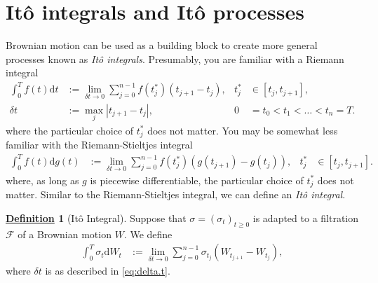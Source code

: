 \documentclass[12pt]{book}
\numberwithin{equation}{chapter}
\theoremstyle{plain}
\numberwithin{theorem}{section}
\theoremstyle{definition}
\newtheorem{definition}[theorem]{\underline{Definition}}
\numberwithin{exercise}{chapter}
\newcommand{\<}{\langle}
\renewcommand{\>}{\rangle}
\renewcommand{\(}{\left(}
\renewcommand{\)}{\right)}
\renewcommand{\[}{\left[}
\renewcommand{\]}{\right]}
\newcommand\Fc{\mathscr{F}}
\newcommand\sig{\sigma}
\newcommand\del{\delta}
\newcommand\dd{\mathrm{d}}
\theoremstyle{definition}
\numberwithin{question}{section}
\begin{document}
\section{It\^o integrals and It\^o processes}
Brownian motion can be used as a building block to create more general processes known as \textit{It\^o integrals}.  
Presumably, you are familiar with a Riemann integral
\begin{align}
\int_0^T f(t) \dd t
	&:= \lim_{\del t \to 0} \sum_{j=0}^{n-1} f(t_j^*) ( t_{j+1} - t_j ) , &
t_j^*
	&\in [t_j, t_{j+1}] , \\
\del t
	&:=	\max_j | t_{j+1} - t_j | , &
0
	&= t_0 < t_1 < \ldots < t_n = T . \label{eq:delta.t}
\end{align}
where the particular choice of $t_j^*$ does not matter.  You may be somewhat less familiar with the Riemann-Stieltjes integral
\begin{align}
\int_0^T f(t) \dd g(t)
	&:= \lim_{\del t \to 0} \sum_{j=0}^{n-1} f(t_j^*) ( g(t_{j+1}) - g(t_j) ) , &
t_j^*
	&\in [t_j, t_{j+1}] .
\end{align}
where, as long as $g$ is piecewise differentiable, the particular choice of $t_j^*$ does not matter.
Similar to the Riemann-Stieltjes integral, we can define an \textit{It\^o integral}.  

\begin{definition}[It\^o Integral]
Suppose that $\sig = (\sig_t)_{t \geq 0}$ is adapted to a filtration $\Fc$ of a Brownian motion $W$.  We define
\begin{align}
\int_0^T \sig_t \dd W_t
	&:= \lim_{\del t \to 0} \sum_{j=0}^{n-1} \sig_{t_j} ( W_{t_{j+1}} - W_{t_j} )  , \label{eq:ito.def}
\end{align}
where $\del t$ is as described in \eqref{eq:delta.t}.
\end{definition}
\end{document}
